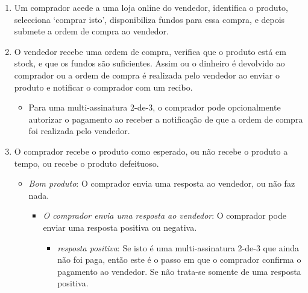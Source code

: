 \iffalse
\begin{enumerate}
    \item Um comprador acede a uma loja online do vendedor, identifica o produto, selecciona `comprar isto', disponibiliza fundos para essa compra, e depois submete a ordem de compra ao vendedor.
    \item O vendedor recebe uma ordem de compra, verifica que o produto está em stock, e que os fundos são suficientes. Assim ou o dinheiro é devolvido ao comprador ou a ordem de compra é realizada pelo vendedor ao enviar o produto e notificar o comprador com um recibo.  
    \begin{itemize}
        \item Para uma multi-assinatura 2-de-3, o comprador pode opcionalmente autorizar o pagamento ao receber a notificação de que a ordem de compra foi realizada  pelo vendedor.
    \end{itemize}{}
    \item O comprador recebe o produto como esperado, ou não recebe o produto a tempo, ou recebe o produto defeituoso.
    \begin{itemize}
        \item {\em Bom produto}: O comprador envia uma resposta ao vendedor, ou não faz nada. 
        \begin{itemize}
            \item {\em O comprador envia uma resposta ao vendedor}: O comprador pode enviar uma resposta positiva ou negativa. 
            \begin{itemize}
                \item {\em resposta positiva}: Se isto é uma multi-assinatura 2-de-3 que ainda não foi paga, então este é o passo em que o comprador confirma o pagamento ao vendedor. Se não trata-se somente de uma resposta positiva. 

\end{itemize}
\end{itemize}
\end{itemize}
\end{enumerate}

